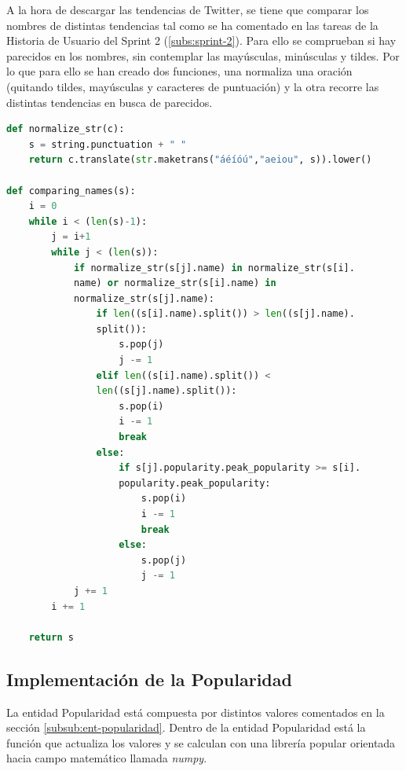 A la hora de descargar las tendencias de Twitter, se tiene que comparar los nombres de distintas tendencias tal como se ha comentado en las tareas de la Historia de Usuario del Sprint 2 (\ref{subs:sprint-2}). Para ello se comprueban si hay parecidos en los nombres, sin contemplar las mayúsculas, minúsculas y tildes. Por lo que para ello se han creado dos funciones, una normaliza una oración (quitando tildes, mayúsculas y caracteres de puntuación) y la otra recorre las distintas tendencias en busca de parecidos.

\vspace{0.3cm}

\begin{lstlisting}[caption=Comprobación de los nombres de tendencia,          label={lst:listing-python},language=Python]
def normalize_str(c):
    s = string.punctuation + " "
    return c.translate(str.maketrans("áéíóú","aeiou", s)).lower()

def comparing_names(s):
    i = 0
    while i < (len(s)-1):
        j = i+1
        while j < (len(s)):
            if normalize_str(s[j].name) in normalize_str(s[i].
            name) or normalize_str(s[i].name) in 
            normalize_str(s[j].name):
                if len((s[i].name).split()) > len((s[j].name).
                split()):
                    s.pop(j)
                    j -= 1
                elif len((s[i].name).split()) < 
                len((s[j].name).split()):
                    s.pop(i)
                    i -= 1
                    break
                else:
                    if s[j].popularity.peak_popularity >= s[i].
                    popularity.peak_popularity:
                        s.pop(i)
                        i -= 1
                        break
                    else:
                        s.pop(j)
                        j -= 1
            j += 1
        i += 1

    return s
\end{lstlisting}

\subsection{Implementación de la Popularidad}
La entidad Popularidad está compuesta por distintos valores comentados en la sección \ref{subsub:ent-popularidad}. Dentro de la entidad Popularidad está la función que actualiza los valores y se calculan con una librería popular orientada hacia campo matemático llamada \textit{numpy}.

\vspace{0.3cm}

